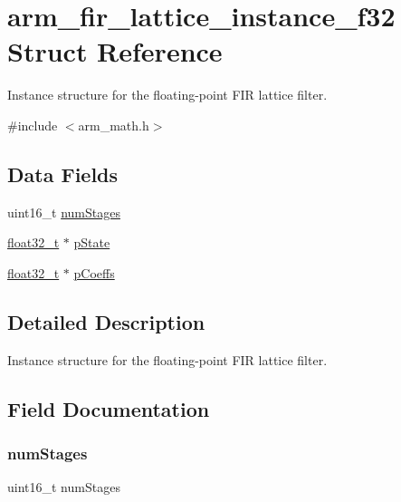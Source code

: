 \hypertarget{structarm__fir__lattice__instance__f32}{}\section{arm\+\_\+fir\+\_\+lattice\+\_\+instance\+\_\+f32 Struct Reference}
\label{structarm__fir__lattice__instance__f32}


Instance structure for the floating-\/point F\+IR lattice filter.  




{\ttfamily \#include $<$arm\+\_\+math.\+h$>$}

\subsection*{Data Fields}
\begin{DoxyCompactItemize}
\item 
uint16\+\_\+t \mbox{\hyperlink{structarm__fir__lattice__instance__f32_a4cceb90547b3e585d4c7aabaa8057212}{num\+Stages}}
\item 
\mbox{\hyperlink{arm__math_8h_a4611b605e45ab401f02cab15c5e38715}{float32\+\_\+t}} $\ast$ \mbox{\hyperlink{structarm__fir__lattice__instance__f32_a335c87e6fdc4b96601d95a5de8b9c463}{p\+State}}
\item 
\mbox{\hyperlink{arm__math_8h_a4611b605e45ab401f02cab15c5e38715}{float32\+\_\+t}} $\ast$ \mbox{\hyperlink{structarm__fir__lattice__instance__f32_aacbb8dd8eeba4b21fc2bb40076405ee3}{p\+Coeffs}}
\end{DoxyCompactItemize}


\subsection{Detailed Description}
Instance structure for the floating-\/point F\+IR lattice filter. 

\subsection{Field Documentation}
\mbox{\label{structarm__fir__lattice__instance__f32_a4cceb90547b3e585d4c7aabaa8057212}} 
\subsubsection{\texorpdfstring{numStages}{numStages}}
{\footnotesize\ttfamily uint16\+\_\+t num\+Stages}

